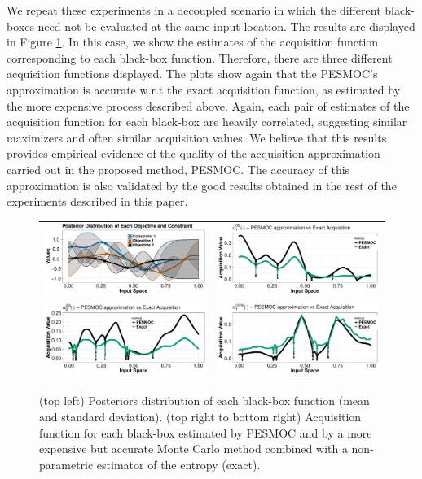 \documentclass[review,preprint,12pt]{elsarticle}
\begin{document}
We repeat these experiments in a decoupled scenario in which the different black-boxes need not be evaluated
at the same input location. The results are displayed in Figure \ref{fig:exact_decoupled}. In this case, we
show the estimates of the acquisition function corresponding to each black-box function. Therefore,
there are three different acquisition functions displayed. The plots show 
again that the PESMOC's approximation is accurate w.r.t the exact acquisition function, as  estimated by the 
more expensive process described above. Again, each pair of estimates of the acquisition function for each 
black-box are heavily correlated, suggesting similar maximizers and often similar acquisition values. We 
believe that this results provides empirical evidence of the quality of the acquisition approximation carried out 
in the proposed method, PESMOC. The accuracy of this approximation is also validated by the good results 
obtained in the rest of the experiments described in this paper.

\begin{figure}[htb]
\begin{center}
\begin{tabular}{cc}
        \includegraphics[width=0.45\linewidth]{figures/acquisition/plot_posterior.pdf} &
        \includegraphics[width=0.45\linewidth]{figures/acquisition/plot_acq_obj_1.pdf} \\
        \includegraphics[width=0.45\linewidth]{figures/acquisition/plot_acq_obj_2.pdf} &
        \includegraphics[width=0.45\linewidth]{figures/acquisition/plot_acq_con_1.pdf}
\end{tabular}
\caption{(top left) Posteriors distribution of each black-box function (mean and standard deviation).
	(top right to bottom right) Acquisition function for each black-box estimated by PESMOC and by a 
	more expensive but accurate Monte Carlo method combined with a non-parametric estimator of the entropy (exact). 
	}
        \label{fig:exact_decoupled}
\end{center}
\end{figure}
\end{document}
